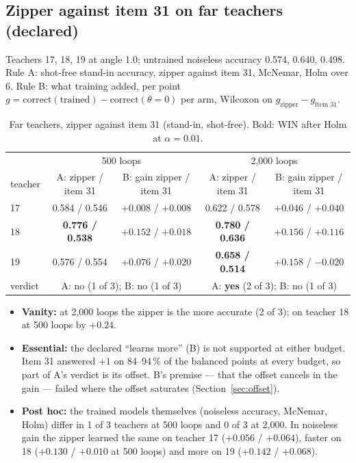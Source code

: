\documentclass[11pt]{article}
\begin{document}
\subsection{Zipper against item 31 on far teachers (declared)}
\label{sec:fart}

Teachers 17, 18, 19 at angle 1.0; untrained noiseless accuracy 0.574, 0.640, 0.498. Rule A: shot-free stand-in
accuracy, zipper against item 31, McNemar, Holm over 6. Rule B: what training added, per point $g = \text{correct}
(\text{trained}) - \text{correct}(\theta = 0)$ per arm, Wilcoxon on $g_{\text{zipper}} - g_{\text{item 31}}$.

\begin{table}[h]
\centering
\small
\begin{tabular}{lcccc}
\toprule
 & \multicolumn{2}{c}{500 loops} & \multicolumn{2}{c}{2{,}000 loops} \\
teacher & A: zipper / item 31 & B: gain zipper / item 31 & A: zipper / item 31 & B: gain zipper / item 31 \\
\midrule
17 & 0.584 / 0.546 & $+0.008$ / $+0.008$ & 0.622 / 0.578 & $+0.046$ / $+0.040$ \\
18 & \textbf{0.776 / 0.538} & $\mathbf{+0.152}$ / $\mathbf{+0.018}$ & \textbf{0.780 / 0.636} & $+0.156$ / $+0.116$ \\
19 & 0.576 / 0.554 & $+0.076$ / $+0.020$ & \textbf{0.658 / 0.514} & $\mathbf{+0.158}$ / $\mathbf{-0.020}$ \\
\midrule
verdict & \multicolumn{2}{c}{A: no (1 of 3); B: no (1 of 3)} & \multicolumn{2}{c}{A: \textbf{yes} (2 of 3); B: no (1 of 3)} \\
\bottomrule
\end{tabular}
\caption{Far teachers, zipper against item 31 (stand-in, shot-free). Bold: WIN after Holm at $\alpha = 0.01$.}
\label{tab:fart}
\end{table}

\begin{itemize}
\item \textbf{Vanity:} at 2{,}000 loops the zipper is the more accurate (2 of 3); on teacher 18 at 500 loops by
$+0.24$.
\item \textbf{Essential:} the declared ``learns more'' (B) is not supported at either budget. Item 31 answered $+1$ on
84--94\,\% of the balanced points at every budget, so part of A's verdict is its offset. B's premise --- that the
offset cancels in the gain --- failed where the offset saturates (Section~\ref{sec:offset}).
\item \textbf{Post hoc:} the trained models themselves (noiseless accuracy, McNemar, Holm) differ in 1 of 3 teachers at
500 loops and 0 of 3 at 2{,}000. In noiseless gain the zipper learned the same on teacher 17 ($+0.056$ / $+0.064$),
faster on 18 ($+0.130$ / $+0.010$ at 500 loops) and more on 19 ($+0.142$ / $+0.068$).
\end{itemize}
\end{document}
